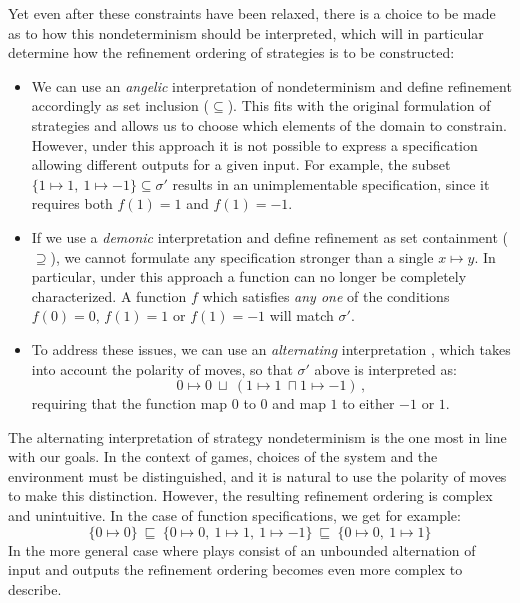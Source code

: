 \documentclass[11pt,oneside,draft]{book}
\theoremstyle{definition}
\begin{document}
Yet even after these constraints have been relaxed,
there is a choice to be made as to how
this nondeterminism should be interpreted,
which will in particular determine
how the refinement ordering of strategies
is to be constructed:
\begin{itemize}
  \item We can use an \emph{angelic} interpretation of nondeterminism
    and define refinement accordingly as set inclusion ($\subseteq$).
    This fits with the original formulation of strategies
    and allows us to choose
    which elements of the domain to constrain.
    However, under this approach it is not possible
    to express a specification
    allowing different outputs for a given input.
    For example, the subset
    $\{ 1 \mapsto 1, \: 1 \mapsto -1 \} \subseteq \sigma'$
    results in an unimplementable specification,
    since it requires both
    $f(1) = 1$ and $f(1) = -1$.
  \item If we use a \emph{demonic} interpretation
    and define refinement as set containment ($\supseteq$),
    we cannot formulate any specification
    stronger than a single $x \mapsto y$.
    In particular, under this approach a function can no longer be
    completely characterized.
    A function $f$
    which satisfies \emph{any one} of the conditions
    $f(0) = 0$, $f(1) = 1$ or $f(1) = -1$ will
    match $\sigma'$.
  \item
    To address these issues,
    we can use an \emph{alternating} interpretation
    \citep{altref},
    which takes into account the polarity of moves,
    so that $\sigma'$ above is interpreted as:
    \[
      0 \mapsto 0 \: \sqcup \:
      (1 \mapsto 1 \: \sqcap 1 \mapsto -1)
      \,,
    \]
    requiring that the function
    map $0$ to $0$ and
    map $1$ to either $-1$ or $1$.
\end{itemize}

The alternating interpretation of strategy nondeterminism
is the one most in line with our goals.
In the context of games,
choices of the system and the environment must be distinguished,
and it is natural to use the polarity of moves
to make this distinction.
However,
the resulting refinement ordering
is complex and unintuitive.
In the case of function specifications,
we get for example:
\[
  \{ 0 \mapsto 0 \}
  \: \sqsubseteq \:
  \{ 0 \mapsto 0, \: 1 \mapsto 1, \: 1 \mapsto -1 \}
  \: \sqsubseteq \:
  \{ 0 \mapsto 0, \: 1 \mapsto 1 \}
\]
In the more general case where plays consist of
an unbounded alternation of input and outputs
the refinement ordering becomes even more
complex to describe.
\end{document}
